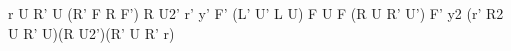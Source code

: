 r U R' U (R' F R F') R U2' r'
y' F' (L' U' L U) F U F (R U R' U') F'
y2 (r' R2 U R' U)(R U2')(R' U R' r)
